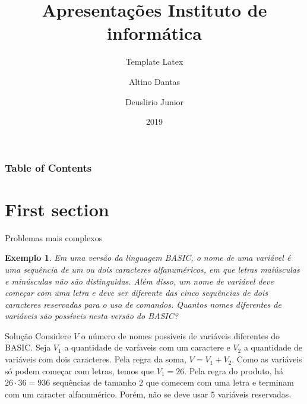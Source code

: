 \documentclass[aspectratio=169,t]{beamer}
\newtheorem{ex}{Exemplo}
\begin{document}
\title[Inf UFG]{Apresentações Instituto de informática}
\subtitle{Template Latex}

\author{Altino Dantas \and Deuslirio Junior}

\date{2019}
\frame[noframenumbering]{\titlepage}




\begin{frame}
\frametitle{Table of Contents}
\tableofcontents
\end{frame}

\section{First section}

 \begin{frame}{Problemas mais complexos}
\footnotesize
  \begin{ex}
Em uma versão da linguagem BASIC, o nome de uma variável é uma sequência de um ou dois caracteres alfanuméricos, em que letras maiúsculas e minúsculas não são distinguidas. Além disso, um nome de variável deve começar com uma letra e deve ser diferente das cinco sequências de dois caracteres reservadas para o uso de comandos. Quantos nomes diferentes de variáveis são possíveis nesta versão do BASIC?
  \end{ex}

\begin{block}{Solução}
Considere $V$ o número de nomes possíveis de variáveis diferentes do BASIC. Seja $V_1$ a quantidade de varíaveis com um caractere e $V_2$ a quantidade de variáveis com dois caracteres. Pela regra da soma, $V=V_1+V_2$. Como as variáveis só podem começar com letras, temos que $V_1=26$. Pela regra do produto, há $26\cdot 36=936$ sequências de tamanho $2$ que comecem com uma letra e terminam com um caracter alfanumérico. Porém, não se deve usar $5$ variáveis reservadas.
  \end{block}

 \end{frame}
\end{document}
